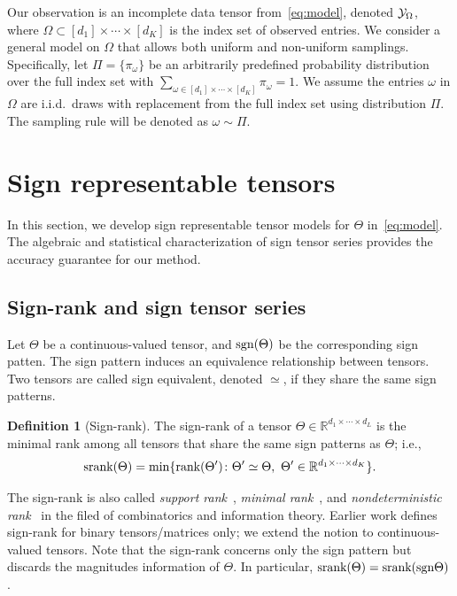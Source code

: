\documentclass{article}
\theoremstyle{plain}
\theoremstyle{definition}
\newtheorem{defn}{Definition}
\def\sign{\textup{sgn}}
\def\srank{\textup{srank}}
\def\rank{\textup{rank}}
\begin{document}
Our observation is an incomplete data tensor from~\eqref{eq:model}, denoted $\mathcal{Y}_\Omega$, where $\Omega\subset[d_1]\times\cdots\times[d_K]$ is the index set of observed entries. We consider a general model on $\Omega$ that allows both uniform and non-uniform samplings. Specifically, let $\Pi=\{\pi_\omega\}$ be an arbitrarily predefined probability distribution over the full index set with $\sum_{\omega\in[d_1]\times \cdots \times [d_K]}\pi_\omega=1$. We assume the entries $\omega$ in $\Omega$ are i.i.d.\ draws with replacement from the full index set using distribution $\Pi$. The sampling rule will be denoted as $\omega\sim \Pi$.


\section{Sign representable tensors}\label{sec:representation}
In this section, we develop sign representable tensor models for $\Theta$ in~\eqref{eq:model}. The algebraic and statistical characterization of sign tensor series provides the accuracy guarantee for our method. 

\subsection{Sign-rank and sign tensor series}\label{sec:sign-rank}
Let $\Theta$ be a continuous-valued tensor, and $\sign (\Theta)$ be the corresponding sign patten. The sign pattern induces an equivalence relationship between tensors. Two tensors are called sign equivalent, denoted $\simeq$, if they share the same sign patterns. 

\begin{defn}[Sign-rank]
The sign-rank of a tensor $\Theta\in\mathbb{R}^{d_1\times \cdots \times d_L}$ is the minimal rank among all tensors that share the same sign patterns as $\Theta$; i.e.,
\[
\srank(\Theta) = \min \{\rank(\Theta')\colon  \Theta'\simeq \Theta,\ \Theta'\in\mathbb{R}^{d_1\times \cdots \times d_K}\}.
\]
\end{defn}
The sign-rank is also called \emph{support rank}~\cite{cohn2013fast}, \emph{minimal rank}~\cite{alon2016sign}, and \emph{nondeterministic rank}~\cite{de2003nondeterministic} in the filed of combinatorics and information theory. Earlier work defines sign-rank for binary tensors/matrices only; we extend the notion to continuous-valued tensors. Note that the sign-rank concerns only the sign pattern but discards the magnitudes information of $\Theta$. In particular, $\srank(\Theta)=\srank(\sign \Theta)$. 
\end{document}
